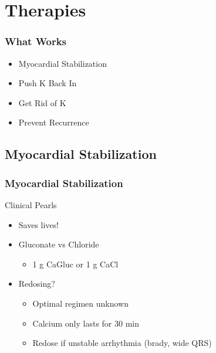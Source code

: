 \documentclass{beamer}
\begin{document}
\section{Therapies}
\begin{frame}
	\frametitle{What Works}
		\begin{itemize}
			\item Myocardial Stabilization
			\item Push K Back In
			\item Get Rid of K
			\item Prevent Recurrence
		\end{itemize}
\end{frame}
\subsection{Myocardial Stabilization}
\begin{frame}
	\frametitle{Myocardial Stabilization}
	Clinical Pearls
		\begin{itemize}
			\item Saves lives!
			\item Gluconate vs Chloride
			\begin{itemize}
				\item 1 g CaGluc or 1 g CaCl
				\end{itemize}
			\item Redosing?
			\begin{itemize}
				\item Optimal regimen unknown
				\item Calcium only lasts for 30 min
				\item Redose if unstable arrhythmia (brady, wide QRS)
			\end{itemize}
		\end{itemize}
\end{frame}
\end{document}
